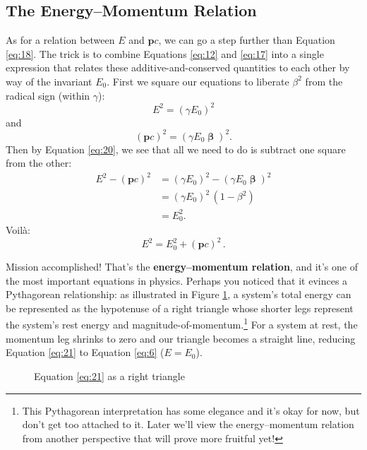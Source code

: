 \documentclass[12pt]{article}
\renewcommand{\vv}[1]{\mathbf{#1}}
\newcommand{\vvbeta}{\bm{\upbeta}}
\begin{document}
\subsection{The Energy--Momentum Relation}\label{ssec:em}

As for a relation between $E$ and $\vv p c$, we can go a step further than Equation \ref{eq:18}. The trick is to combine Equations \ref{eq:12} and \ref{eq:17} into a single expression that relates these additive-and-conserved quantities to each other by way of the invariant $E_0$. First we square our equations to liberate $\beta^2$ from the radical sign (within $\gamma$):
\begin{equation*}
E^2 = (\gamma E_0)^2
\end{equation*}
and
\begin{equation*}
(\vv p c)^2 = (\gamma E_0 \vvbeta)^2.
\end{equation*}
Then by Equation \ref{eq:20}, we see that all we need to do is subtract one square from the other:
\begin{equation*}
\begin{split}
E^2 - (\vv p c)^2 &= (\gamma E_0)^2 - (\gamma E_0 \vvbeta)^2 \\[2pt]
&= (\gamma E_0)^2 \, (1 - \beta^2) \\[2pt]
&= E_0^2.
\end{split}
\end{equation*}
Voil\`a:
\begin{equation}\label{eq:21}
\boxed{E^2=E_0^2+(\vv p c)^2} \, .
\end{equation}

Mission accomplished! That's the \textbf{energy--momentum relation}, and it's one of the most important equations in physics. Perhaps you noticed that it evinces a Pythagorean relationship: as illustrated in Figure \ref{f:emrelation}, a system's total energy can be represented as the hypotenuse of a right triangle whose shorter legs represent the system's rest energy and magnitude-of-momentum.\footnote{This Pythagorean interpretation has some elegance and it's okay for now, but don't get too attached to it. Later we'll view the energy--momentum relation from another perspective that will prove more fruitful yet!} For a system at rest, the momentum leg shrinks to zero and our triangle becomes a straight line, reducing Equation \ref{eq:21} to Equation \ref{eq:6} ($E=E_0$).

\begin{figure}[h]
\centering
{}
\caption{Equation \ref{eq:21} as a right triangle}
\label{f:emrelation}
\end{figure}
\end{document}
